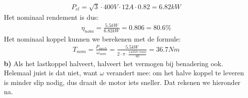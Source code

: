 \begin{oefenblok}
\begin{align*}
    P_{el} = \sqrt{3} \cdot 400 V \cdot 12 A \cdot 0.82 = 6.82 kW
\end{align*}
Het nominaal rendement is dus:
\begin{align*}
    \eta_{nom} = \frac{5.5 kW}{6.82 kW} = 0.806 = 80.6\%
\end{align*}
Het nominaal koppel kunnen we berekenen met de formule:
\begin{align*}
    T_{nom} = \frac{P_{mech}}{\omega_{nom}} = \frac{5.5 kW}{2 \cdot \pi \cdot \frac{1435 tr/min}{60}} = 36.7 Nm
\end{align*}
\textbf{b)}
\newline
Als het lastkoppel halveert, halveert het vermogen bij benadering ook. Helemaal juist is dat
niet, want $\omega$ verandert mee: om het halve koppel te leveren is minder slip nodig, dus
draait de motor iets sneller. Dat rekenen we hieronder na.


\end{oefenblok}
